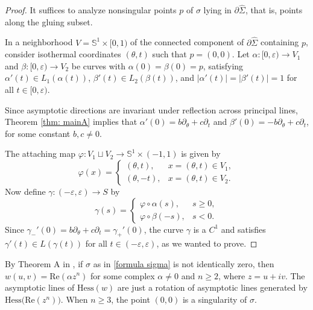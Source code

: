 \documentclass[11pt,reqno]{amsart}
\begin{document}
\begin{proof}
    It suffices to analyze nonsingular points $p$ of $\sigma$ lying in $\partial\widehat{\Sigma}$, that is, points along the gluing subset. 
    
    In a neighborhood $V=\mathbb{S}^1\times [0,1)$ of the connected component of $\partial\widehat{\Sigma}$ containing $p$, consider isothermal coordinates $(\theta,t)$ such that $p=(0,0)$. Let $\alpha:[0,\varepsilon)\rightarrow V_1$ and $\beta:[0,\varepsilon)\rightarrow V_2$ be curves with $\alpha(0)=\beta(0)=p$, satisfying $\alpha'(t)\in L_1(\alpha(t))$, $\beta'(t)\in L_2(\beta(t))$, and $|\alpha'(t)|=|\beta'(t)|=1$ for all $t\in[0,\varepsilon)$.

    Since asymptotic directions are invariant under reflection across principal lines, Theorem \ref{thm: mainA} implies that $\alpha'(0)=b\partial_\theta+c\partial_t$ and $\beta'(0)=-b\partial_\theta+c\partial_t$, for some constant $b,c\neq 0$. 
    
    The attaching map $\varphi: V_1\sqcup  V_2\rightarrow \mathbb{S}^1\times(-1,1)$ is given by    
    \begin{equation*}
        \varphi(x)=\begin{cases}
            (\theta,t), & x=(\theta,t)\in V_1, \\
            (\theta,-t), & x=(\theta,t)\in V_2.
        \end{cases}
    \end{equation*}
    Now define $\gamma:(-\varepsilon,\varepsilon)\rightarrow S$ by
    \begin{equation*}
        \gamma(s)=\begin{cases}
            \varphi\circ\alpha(s),& s\geq 0, \\ \varphi\circ\beta(-s),& s<0.
        \end{cases}
    \end{equation*}
    Since $\gamma_-'(0)=b\partial_\theta+c\partial_t=\gamma_+'(0)$, the curve $\gamma$ is a $C^1$ and satisfies $\gamma'(t)\in L(\gamma(t))$ for all $t\in (-\varepsilon,\varepsilon)$, as we wanted to prove.
\end{proof} 
By Theorem A in \cite{Bers1956}, if $\sigma$ as in \eqref{formula sigma} is not identically zero, then $w(u,v)=\text{Re}(\alpha z^n)$ for some complex $\alpha\neq 0$ and $n\geq 2$, where $z=u+iv$. The asymptotic lines of $\text{Hess}(w)$ are just a rotation of asymptotic lines generated by $\text{Hess(Re}(z^n))$. When $n\geq 3$, the point $(0,0)$ is a singularity of $\sigma$.
\end{document}

